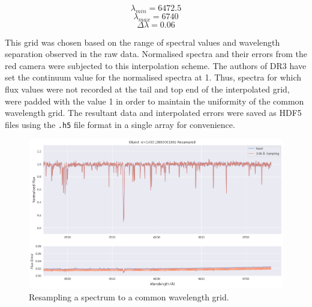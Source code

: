 \[\lambda_{min} = 6472.5\]
\[\lambda_{max} = 6740\]
\[\Delta\lambda = 0.06\]

This grid was chosen based on the range of spectral values and wavelength separation observed in the raw data. Normalised spectra and their errors from the red camera were subjected to this interpolation scheme. The authors of DR3 have set the continuum value for the normalised spectra at 1. Thus, spectra for which flux values were not recorded at the tail and top end of the interpolated grid, were padded with the value 1 in order to maintain the uniformity of the common wavelength grid. The resultant data and interpolated errors were saved as HDF5 files using the \texttt{.h5} file format in a single array for convenience.

\begin{figure}[t]
\centering
\includegraphics[scale=.50]{figures/resampling example.png}
\caption{Resampling a spectrum to a common wavelength grid.}
\end{figure}

